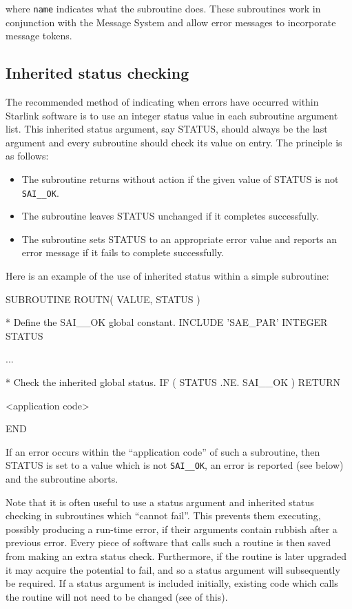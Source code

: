\documentclass[twoside,11pt]{starlink}
\providecommand{\const}[1]{\texttt{#1}}
\providecommand{\saiok}{\const{SAI\_\_OK}}
\begin{document}
where \texttt{name} indicates what the subroutine does.
These subroutines work in conjunction with the Message System and allow error
messages to incorporate message tokens.


\subsection{Inherited status checking
\label{inherited_status} }
The recommended method of indicating when errors have occurred within
Starlink software is to use an integer status value in each subroutine
argument list.
This inherited status argument, say STATUS, should always be the last
argument and every subroutine should check its value on entry.
The principle is as follows:

\begin {itemize}
\item The subroutine returns without action if the given value of STATUS is
not \saiok.

\item The subroutine leaves STATUS unchanged if it completes successfully.

\item The subroutine sets STATUS to an appropriate error value and reports an
error message if it fails to complete successfully.
\end {itemize}

Here is an example of the use of inherited status within a simple subroutine:

\begin {small}
\begin{terminalv}
      SUBROUTINE ROUTN( VALUE, STATUS )

*  Define the SAI__OK global constant.
      INCLUDE 'SAE_PAR'
      INTEGER STATUS

      ...

*  Check the inherited global status.
      IF ( STATUS .NE. SAI__OK ) RETURN

      <application code>

      END
\end{terminalv}
\end {small}

If an error occurs within the ``application code'' of such a subroutine, then
STATUS is set to a value which is not \saiok, an error is reported (see
below) and the subroutine aborts.

Note that it is often useful to use a status argument and inherited status
checking in subroutines which ``cannot fail''.
This prevents them executing, possibly producing a run-time error, if
their arguments contain rubbish after a previous error.
Every piece of software that calls such a routine is then saved from making
an extra status check.
Furthermore, if the routine is later upgraded it may acquire the potential
to fail, and so a status argument will subsequently be required.
If a status argument is included initially, existing code which calls
the routine will not need to be changed (see
of this).
\end{document}
